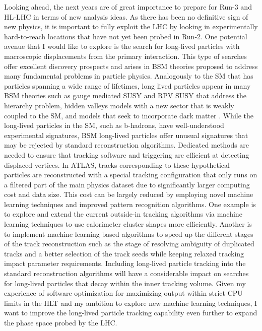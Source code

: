 \documentclass[a4paper]{article}
\begin{document}
Looking ahead, the next years are of great importance to prepare for Run-3 and HL-LHC in terms of new analysis ideas. As there has been no definitive sign of new physics, it is important to fully exploit the LHC by looking in experimentally hard-to-reach locations that have not yet been probed in Run-2. One potential avenue that I would like to explore is the search for long-lived particles with macroscopic displacements from the primary interaction. This type of searches offer excellent discovery prospects and arises in BSM theories proposed to address many fundamental problems in particle physics. Analogously to the SM that has particles spanning a wide range of lifetimes, long lived particles appear in many BSM theories such as gauge mediated SUSY and RPV SUSY that address the hierarchy problem, hidden valleys models with a new sector that is weakly coupled to the SM, and models that seek to incorporate dark matter \cite{alimena2019searching}. While the long-lived particles in the SM, such as b-hadrons, have well-understood experimental signatures, BSM long-lived particles offer unusual signatures that may be rejected by standard reconstruction algorithms. Dedicated methods are needed to ensure that tracking software and triggering are efficient at detecting displaced vertices. In ATLAS, tracks corresponding to these hypothetical particles are reconstructed with a special tracking configuration that only runs on a filtered part of the main physics dataset due to significantly larger computing cost and data size. This cost can be largely reduced by employing novel machine learning techniques and improved pattern recognition algorithms. One example is to explore and extend the current outside-in tracking algorithms via machine learning techniques to use calorimeter cluster shapes more efficiently. Another is to implement machine learning based algorithms to speed up the different stages of the track reconstruction such as the stage of resolving ambiguity of duplicated tracks and a  better selection of the track seeds while keeping relaxed tracking impact parameter requirements. Including long-lived particle tracking into the standard reconstruction algorithms will have a considerable impact on searches for long-lived particles that decay within the inner tracking volume. Given my experience of software optimization for maximizing output within strict CPU limits in the HLT and my ambition to explore new machine learning techniques, I want to improve the long-lived particle tracking capability even further to expand the phase space probed by the LHC.
\end{document}
